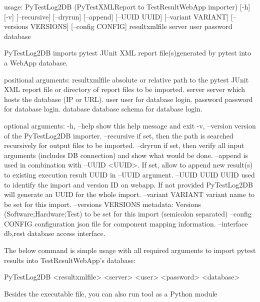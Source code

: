 \begin{robotlog}
usage: PyTestLog2DB (PyTestXMLReport to TestResultWebApp importer) [-h] [-v]
                    [--recursive] [--dryrun] [--append] [--UUID UUID]
                    [--variant VARIANT] [--versions VERSIONS] [--config CONFIG]
                    resultxmlfile server user password database

PyTestLog2DB imports pytest JUnit XML report file(s)generated by pytest into a WebApp database.

positional arguments:
resultxmlfile        absolute or relative path to the pytest JUnit XML report
                     file or directory of report files to be imported.
server               server which hosts the database (IP or URL).
user                 user for database login.
password             password for database login.
database             database schema for database login.

optional arguments:
-h, --help           show this help message and exit
-v, --version        version of the PyTestLog2DB importer.
--recursive          if set, then the path is searched recursively for output
                     files to be imported.
--dryrun             if set, then verify all input arguments (includes DB connection)
                     and show what would be done.
--append             is used in combination with --UUID <UUID>. If set, allow to append
                     new result(s) to existing execution result UUID in --UUID argument.
--UUID UUID          UUID used to identify the import and version ID on webapp.
                     If not provided PyTestLog2DB will generate an UUID for the whole import.
--variant VARIANT    variant name to be set for this import.
--versions VERSIONS  metadata: Versions (Software;Hardware;Test) to be set for this import
                     (semicolon separated)
--config CONFIG      configuration json file for component mapping information.
--interface {db,rest} 
                     database access interface.
\end{robotlog}

    The below command is simple usage with all required arguments to import
    pytest results into TestResultWebApp's database:

\begin{robotlog}
PyTestLog2DB <resultxmlfile> <server> <user> <password> <database>
\end{robotlog}

    Besides the executable file, you can also run tool as a Python module

